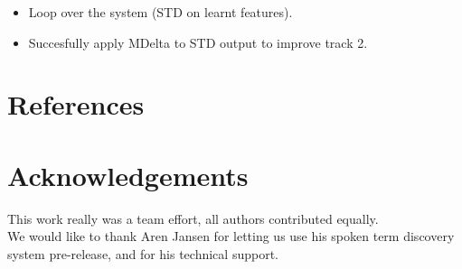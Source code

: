 \documentclass[final]{beamer}
\begin{document}
\begin{frame}[t]
\begin{multicols}{3}
\begin{itemize}
\item Loop over the system (STD on learnt features).
\item Succesfully apply MDelta to STD output to improve track 2.
\end{itemize}


\section{References}

\nocite{*} %


\section{Acknowledgements}

This work really was a team effort, all authors contributed equally.\\
We would like to thank Aren Jansen for letting us use his spoken term discovery system pre-release, and for his technical support.


\end{multicols}

\end{frame}
\end{document}
